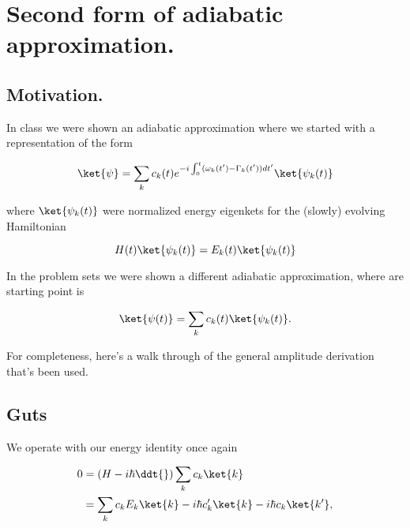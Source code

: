 
%

\chapter{Second form of adiabatic approximation.}
\label{chap:adiabaticApproximation}
{}
\date{Dec 11, 2011}

\beginArtWithToc

\section{Motivation.}

In class we were shown an adiabatic approximation where we started with a representation of the form

\begin{equation}\label{eqn:adiabaticApproximation:10}
\ket{\psi} = \sum_k c_k(t) e^{-i \int_0^t (\omega_k(t') - \Gamma_k(t')) dt' } \ket{\psi_k(t)}
\end{equation}

where $\ket{\psi_k(t)}$ were normalized energy eigenkets for the (slowly) evolving Hamiltonian

\begin{equation}\label{eqn:adiabaticApproximation:30}
H(t) \ket{\psi_k(t)} = E_k(t) \ket{\psi_k(t)}
\end{equation}

In the problem sets we were shown a different adiabatic approximation, where are starting point is 

\begin{equation}\label{eqn:adiabaticApproximation:50}
\ket{\psi(t)} = \sum_k c_k(t) \ket{\psi_k(t)}.
\end{equation}

For completeness, here's a walk through of the general amplitude derivation that's been used.

\section{Guts}

We operate with our energy identity once again

\begin{align*}
0 
&=
\left(H - i \hbar \ddt{} \right) \sum_k c_k \ket{k} \\
&=
\sum_k c_k E_k \ket{k} - i \hbar c_k' \ket{k} - i \hbar c_k \ket{k'} ,
\end{align*}

